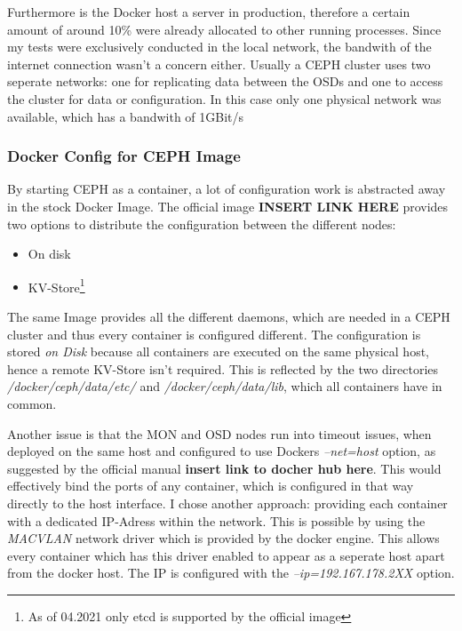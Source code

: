 \documentclass[titlepage, a4paper, 11pt]{scrartcl}
\begin{document}
                Furthermore is the Docker host a server in production, therefore a certain amount of around 10\% were already allocated to other running processes.
                Since my tests were exclusively conducted in the local network, the bandwith of the internet connection wasn't a concern either.
                Usually a CEPH cluster uses two seperate networks: one for replicating data between the OSDs and one to access the cluster for data or configuration.
                In this case only one physical network was available, which has a bandwith of 1GBit/s

            \subsubsection{Docker Config for CEPH Image}\label{config:docker}

                By starting CEPH as a container, a lot of configuration work is abstracted away in the stock Docker Image.
                The official image \textbf{INSERT LINK HERE} provides two options to distribute the configuration between the different nodes:

                \begin{itemize}
                    \item On disk
                    \item KV-Store\footnote{As of 04.2021 only etcd is supported by the official image}
                \end{itemize}

                The same Image provides all the different daemons, which are needed in a CEPH cluster and thus every container is configured different.
                The configuration is stored \textit{on Disk} because all containers are executed on the same physical host, hence a remote KV-Store isn't required.
                This is reflected by the two directories \textit{/docker/ceph/data/etc/} and \textit{/docker/ceph/data/lib}, which all containers have in common.
                
                Another issue is that the MON and OSD nodes run into timeout issues, when deployed on the same host and configured to use Dockers \textit{--net=host} option, as suggested
                by the official manual \textbf{insert link to docher hub here}.
                This would effectively bind the ports of any container, which is configured in that way directly to the host interface. 
                I chose another approach: providing each container with a dedicated IP-Adress within the network. This is possible by using the \textit{MACVLAN} network
                driver which is provided by the docker engine. This allows every container which has this driver enabled to appear as a seperate host apart from the docker host.
                The IP is configured with the \textit{--ip=192.167.178.2XX} option.
\end{document}
